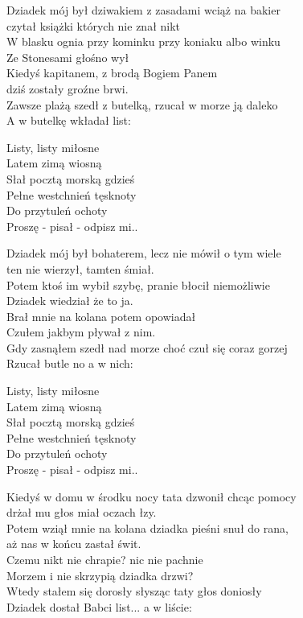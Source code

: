 \begin{text}
    Dziadek mój był dziwakiem z zasadami wciąż na bakier\\
    czytał książki których nie znał nikt\\
    W blasku ognia przy kominku przy koniaku albo winku\\
    Ze Stonesami głośno wył\\
    Kiedyś kapitanem, z brodą Bogiem Panem\\
    dziś zostały groźne brwi.\\
    Zawsze plażą szedł z butelką, rzucał w morze ją daleko\\
    A w butelkę wkładał list:

    \vin Listy, listy miłosne\\
    \vin Latem zimą wiosną\\
    \vin Słał pocztą morską gdzieś\\
    \vin Pełne westchnień tęsknoty\\
    \vin Do przytuleń ochoty\\
    \vin Proszę - pisał - odpisz mi..

    Dziadek mój był bohaterem, lecz nie mówił o tym wiele\\
    ten nie wierzył, tamten śmiał.\\
    Potem ktoś im wybił szybę, pranie błocił niemożliwie\\
    Dziadek wiedział że to ja.\\
    Brał mnie na kolana potem opowiadał\\
    Czułem jakbym pływał z nim.\\
    Gdy zasnąłem szedł nad morze choć czuł się coraz gorzej\\
    Rzucał butle no a w nich:

    \vin Listy, listy miłosne\\
    \vin Latem zimą wiosną\\
    \vin Słał pocztą morską gdzieś\\
    \vin Pełne westchnień tęsknoty\\
    \vin Do przytuleń ochoty\\
    \vin Proszę - pisał - odpisz mi..


    Kiedyś w domu w środku nocy tata dzwonił chcąc pomocy\\
    drżał mu głos miał oczach łzy.\\
    Potem wziął mnie na kolana dziadka pieśni snuł do rana,\\
    aż nas w końcu zastał świt.\\
    Czemu nikt nie chrapie? nic nie pachnie\\
    Morzem i nie skrzypią dziadka drzwi?\\
    Wtedy stałem się dorosły słysząc taty głos doniosły\\
    Dziadek dostał Babci list... a w liście:


\end{text}
